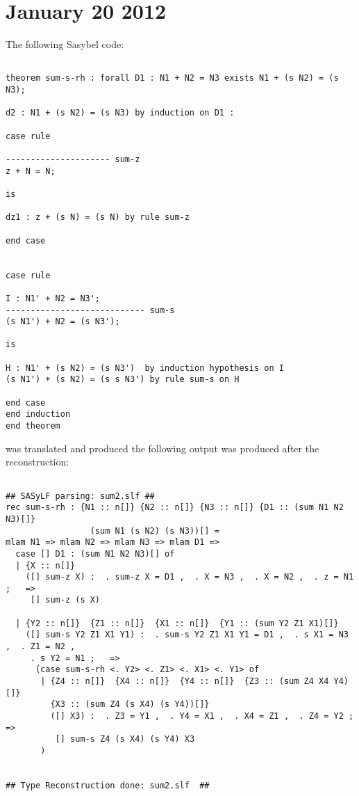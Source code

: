 \documentclass[12pt]{article}
\begin{document}
\section{January 20 2012}
The following \textmd{Sasybel} code:
\footnotesize\begin{verbatim}

theorem sum-s-rh : forall D1 : N1 + N2 = N3 exists N1 + (s N2) = (s N3);

d2 : N1 + (s N2) = (s N3) by induction on D1 :

case rule

--------------------- sum-z
z + N = N;

is

dz1 : z + (s N) = (s N) by rule sum-z

end case


case rule

I : N1' + N2 = N3';
---------------------------- sum-s
(s N1') + N2 = (s N3');

is

H : N1' + (s N2) = (s N3')  by induction hypothesis on I
(s N1') + (s N2) = (s s N3') by rule sum-s on H

end case
end induction
end theorem

\end{verbatim}
was translated and produced the following output was produced after the reconstruction:
\footnotesize\begin{verbatim}

## SASyLF parsing: sum2.slf ##
rec sum-s-rh : {N1 :: n[]} {N2 :: n[]} {N3 :: n[]} {D1 :: (sum N1 N2 N3)[]}
                 (sum N1 (s N2) (s N3))[] =
mlam N1 => mlam N2 => mlam N3 => mlam D1 =>
  case [] D1 : (sum N1 N2 N3)[] of
  | {X :: n[]}
    ([] sum-z X) :  . sum-z X = D1 ,  . X = N3 ,  . X = N2 ,  . z = N1 ;   =>
     [] sum-z (s X)

  | {Y2 :: n[]}  {Z1 :: n[]}  {X1 :: n[]}  {Y1 :: (sum Y2 Z1 X1)[]}
    ([] sum-s Y2 Z1 X1 Y1) :  . sum-s Y2 Z1 X1 Y1 = D1 ,  . s X1 = N3 ,  . Z1 = N2 ,
     . s Y2 = N1 ;   =>
      (case sum-s-rh <. Y2> <. Z1> <. X1> <. Y1> of
       | {Z4 :: n[]}  {X4 :: n[]}  {Y4 :: n[]}  {Z3 :: (sum Z4 X4 Y4)[]}
         {X3 :: (sum Z4 (s X4) (s Y4))[]}
         ([] X3) :  . Z3 = Y1 ,  . Y4 = X1 ,  . X4 = Z1 ,  . Z4 = Y2 ;   =>
          [] sum-s Z4 (s X4) (s Y4) X3
       )


## Type Reconstruction done: sum2.slf  ##



\end{verbatim}
\end{document}
